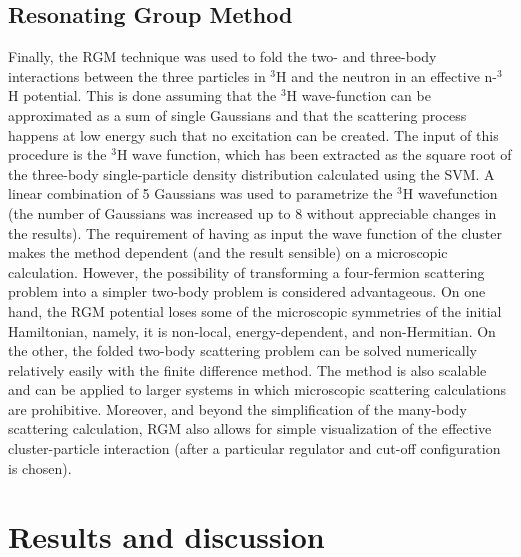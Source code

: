 \documentclass[5p,times]{elsarticle}
\newcommand{\highlight}[1] {\textcolor{red}{{#1}}}
\begin{document}
\subsection{Resonating Group Method}
Finally, the RGM technique was used to fold the two- and three-body interactions between the three particles in $^3$H and
the neutron in an effective n-$^3$H potential. This is done assuming that the $^3$H wave-function can be approximated as a sum of single Gaussians and that the scattering process happens at low energy such that no excitation can be created.
%
The input of this procedure is the $^3$H wave function, which has been extracted as the square root of the three-body single-particle density distribution calculated using the SVM. 
A linear combination of 5 Gaussians was used to parametrize the $^3$H wavefunction (the number of Gaussians was increased up to 8 without appreciable changes in the results). 
The requirement of having as input the wave function of the cluster makes the method dependent (and the result sensible) on a microscopic calculation. 
However, the possibility of transforming a four-fermion scattering problem into a simpler two-body problem is considered advantageous.
%
On one hand, the RGM potential loses some of the microscopic symmetries of the initial Hamiltonian, namely, it is non-local, energy-dependent, and non-Hermitian. 
On the other, the folded two-body scattering problem can be solved numerically relatively easily with the finite difference method. The method is also scalable and can be applied to larger systems in which microscopic scattering calculations are prohibitive.
%
Moreover, and beyond the simplification of the many-body scattering calculation, RGM also allows for simple visualization
of the effective cluster-particle interaction (after a particular regulator and cut-off configuration is chosen).
%


\section{Results and discussion}
\end{document}
